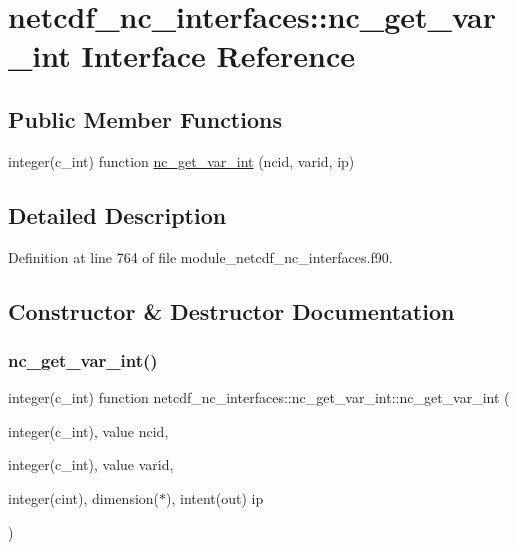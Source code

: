 \hypertarget{interfacenetcdf__nc__interfaces_1_1nc__get__var__int}{}\section{netcdf\+\_\+nc\+\_\+interfaces\+:\+:nc\+\_\+get\+\_\+var\+\_\+int Interface Reference}
\label{interfacenetcdf__nc__interfaces_1_1nc__get__var__int}
\subsection*{Public Member Functions}
\begin{DoxyCompactItemize}
\item 
integer(c\+\_\+int) function \hyperlink{interfacenetcdf__nc__interfaces_1_1nc__get__var__int_abbec2e4e44f7218a77e16f685d4533c6}{nc\+\_\+get\+\_\+var\+\_\+int} (ncid, varid, ip)
\end{DoxyCompactItemize}


\subsection{Detailed Description}


Definition at line 764 of file module\+\_\+netcdf\+\_\+nc\+\_\+interfaces.\+f90.



\subsection{Constructor \& Destructor Documentation}
\mbox{\label{interfacenetcdf__nc__interfaces_1_1nc__get__var__int_abbec2e4e44f7218a77e16f685d4533c6}} 
\subsubsection{\texorpdfstring{nc\+\_\+get\+\_\+var\+\_\+int()}{nc\_get\_var\_int()}}
{\footnotesize\ttfamily integer(c\+\_\+int) function netcdf\+\_\+nc\+\_\+interfaces\+::nc\+\_\+get\+\_\+var\+\_\+int\+::nc\+\_\+get\+\_\+var\+\_\+int (\begin{DoxyParamCaption}\item[{integer(c\+\_\+int), value}]{ncid,  }\item[{integer(c\+\_\+int), value}]{varid,  }\item[{integer(cint), dimension($\ast$), intent(out)}]{ip }\end{DoxyParamCaption})}



